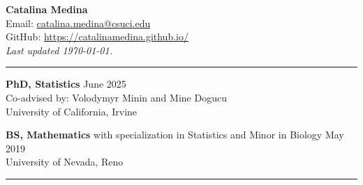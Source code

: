 \documentclass{article}
\makeatletter
\newcommand{\myname}{Catalina Medina}
\newcommand{\myemail}{\href{mailto:catalina.medina@csuci.edu}{catalina.medina@csuci.edu}}
\makeatother
\begin{document}
	\thispagestyle{empty}
	\phantom{.}\vspace{-2cm}
	\begin{center}
		{\huge \bf \myname}\\
		Email: \myemail\\
		GitHub: \href{https://catalinamedina.github.io/}{https://catalinamedina.github.io/}\\
		\emph{Last updated {\today}.}
	\end{center}
	
	\vspace{-4mm}
	\rule{\linewidth}{1pt}
	
	
	\begin{description}
		\vspace{-2mm}
		\item[Education]\hspace*{.1in}
		
		\textbf{PhD, Statistics} \hfill{June 2025} \\
		Co-advised by: Volodymyr Minin and Mine Dogucu\\	
		University of California, Irvine
		\vspace*{1mm}
		
		\textbf{BS, Mathematics} with specialization in Statistics and Minor in Biology \hfill{May 2019} \\
		University of Nevada, Reno
		
	\end{description}
	\vspace{-2mm}
	\rule{\linewidth}{1pt}
	
	
\end{document}
